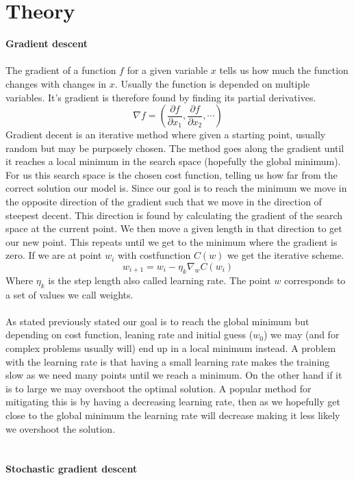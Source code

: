 \documentclass[12pt, letterpaper, twoside]{article}
\begin{document}
\section{Theory}
\textbf{Gradient descent}\\
\ \\
The gradient of a function $f$ for a given variable $x$ tells us how much the function changes with changes in $x$. Usually the function is depended on multiple variables. It's gradient is therefore found by finding its partial derivatives.
$$
\nabla f = \left( \frac{\partial f}{\partial x_1}, \frac{\partial f}{\partial x_2}, \cdots \right)
$$
Gradient decent is an iterative method where given a starting point, usually random but may be purposely chosen. The method goes along the gradient until it reaches a local minimum in the search space (hopefully  the global minimum). For us this search space is the chosen cost function, telling us how far from the correct solution our model is. Since our goal is to reach the minimum we move in the opposite direction of the gradient such that we move in the direction of steepest decent. This direction is found by calculating the gradient of the search space at the current point. We then move a given length in that direction to get our new point. This repeats until we get to the minimum where the gradient is zero. If we are at point $w_i$ with costfunction $C(w)$ we get the iterative scheme.
$$
w_{i+1} = w_i - \eta_k \nabla_w C(w_i)
$$
Where $\eta_k$ is the step length also called learning rate. The point $w$ corresponds to a set of values we call weights.\\
\ \\
As stated previously stated our goal is to reach the global minimum but depending on cost function, leaning rate and initial guess ($w_0$) we may (and for complex problems usually will) end up in a local minimum instead. A problem with the learning rate is that having a small learning rate makes the training slow as we need many points until we reach a minimum. On the other hand if it is to large we may overshoot the optimal solution. A popular method for mitigating this is by having a decreasing learning rate, then as we hopefully get close to the global minimum the learning rate will decrease making it less likely we overshoot the solution.\\
\ \\
\ \\
\textbf{Stochastic gradient descent}\\
\ \\
\end{document}
